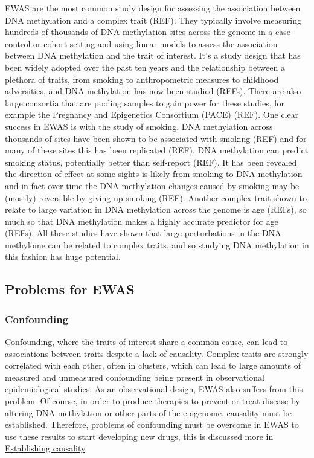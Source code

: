 \documentclass[11pt,twoside]{bristolthesis}
\begin{document}
EWAS are the most common study design for assessing the association between DNA methylation and a complex trait (REF). They typically involve measuring hundreds of thousands of DNA methylation sites across the genome in a case-control or cohort setting and using linear models to assess the association between DNA methylation and the trait of interest. It's a study design that has been widely adopted over the past ten years and the relationship between a plethora of traits, from smoking to anthropometric measures to childhood adversities, and DNA methylation has now been studied (REFs). There are also large consortia that are pooling samples to gain power for these studies, for example the Pregnancy and Epigenetics Consortium (PACE) (REF). One clear success in EWAS is with the study of smoking. DNA methylation across thousands of sites have been shown to be associated with smoking (REF) and for many of these sites this has been replicated (REF). DNA methylation can predict smoking status, potentially better than self-report (REF). It has been revealed the direction of effect at some sights is likely from smoking to DNA methylation and in fact over time the DNA methylation changes caused by smoking may be (mostly) reversible by giving up smoking (REF). Another complex trait shown to relate to large variation in DNA methylation across the genome is age (REFs), so much so that DNA methylation makes a highly accurate predictor for age (REFs). All these studies have shown that large perturbations in the DNA methylome can be related to complex traits, and so studying DNA methylation in this fashion has huge potential.

\hypertarget{problems-for-ewas}{%
\subsection{Problems for EWAS}\label{problems-for-ewas}}

\hypertarget{confounding}{%
\subsubsection{Confounding}\label{confounding}}

Confounding, where the traits of interest share a common cause, can lead to associations between traits despite a lack of causality. Complex traits are strongly correlated with each other, often in clusters, which can lead to large amounts of measured and unmeasured confounding being present in observational epidemiological studies. As an observational design, EWAS also suffers from this problem. Of course, in order to produce therapies to prevent or treat disease by altering DNA methylation or other parts of the epigenome, causality must be established. Therefore, problems of confounding must be overcome in EWAS to use these results to start developing new drugs, this is discussed more in \protect\hyperlink{establishing-causality}{Establishing causality}.
\end{document}
